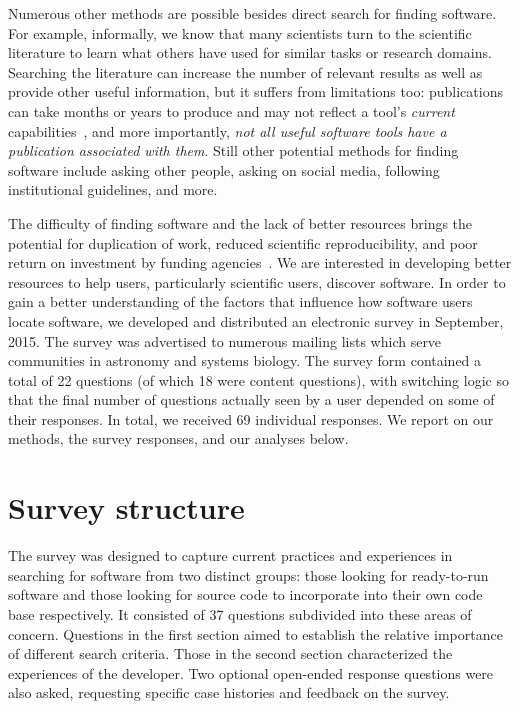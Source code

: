 \documentclass{casicswhitepaper}
\begin{document}
Numerous other methods are possible besides direct search for finding software.  For example, informally, we know that many scientists turn to the scientific literature to learn what others have used for similar tasks or research domains.  Searching the literature can increase the number of relevant results as well as provide other useful information, but it suffers from limitations too: publications can take months or years to produce and may not reflect a tool's \emph{current} capabilities~\cite{wren_2004}, and more importantly, \emph{not all useful software tools have a publication associated with them}.  Still other potential methods for finding software include asking other people, asking on social media, following institutional guidelines, and more.

%
The difficulty of finding software and the lack of better resources brings the potential for duplication of work, reduced scientific reproducibility, and poor return on investment by funding agencies~\citep{cannata_2005}.  We are interested in developing better resources to help users, particularly scientific users, discover software.  In order to gain a better understanding of the factors that influence how software users locate software, we developed and distributed an electronic survey in September, 2015.  The survey was advertised to numerous mailing lists which serve communities in astronomy and systems biology.  The survey form contained a total of 22 questions (of which 18 were content questions), with switching logic so that the final number of questions actually seen by a user depended on some of their responses.  In total, we received 69 individual responses.  We report on our methods, the survey responses, and our analyses below.


\section{Survey structure}

The survey was designed to capture current practices and experiences in searching for software from two distinct groups: those looking for ready-to-run software and those looking for source code to incorporate into their own code base respectively. It consisted of 37 questions subdivided into these areas of concern. Questions in the first section aimed to establish the relative importance of different search criteria. Those in the second section characterized the experiences of the developer. Two optional open-ended response questions were also asked, requesting specific case histories and feedback on the survey. 
\end{document}
